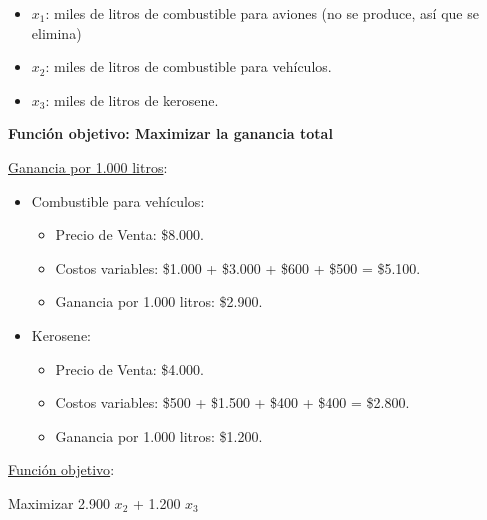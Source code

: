 \documentclass[10pt,a4paper]{article}
\begin{document}
\begin{enumerate}[label=\textbf{\sffamily\large\arabic*.}]
\begin{itemize}
        \item $x_{1}$: miles de litros de combustible para aviones (no se produce, así que se elimina)
        \item $x_{2}$: miles de litros de combustible para vehículos.
        \item $x_{3}$: miles de litros de kerosene. \\

    \end{itemize}

    \clearpage

    \textbf{Función objetivo: Maximizar la ganancia total}

    \vspace{1em}

    \underline{Ganancia por 1.000 litros}:

    \begin{itemize}

        \item Combustible para vehículos:
        \begin{itemize}

            \item Precio de Venta: \$8.000.
            \item Costos variables: \$1.000 + \$3.000 + \$600 + \$500 = \$5.100.
            \item Ganancia por 1.000 litros: \$2.900. \\
    
        \end{itemize}

        \item Kerosene:
        \begin{itemize}

            \item Precio de Venta: \$4.000.
            \item Costos variables: \$500 + \$1.500 + \$400 + \$400 = \$2.800.
            \item Ganancia por 1.000 litros: \$1.200. \\
    
        \end{itemize}

    \end{itemize}

    \underline{Función objetivo}: 

    \begin{center}
        
        Maximizar 2.900 $x_{2}$ + 1.200 $x_{3}$


\end{center}
\end{enumerate}
\end{document}
